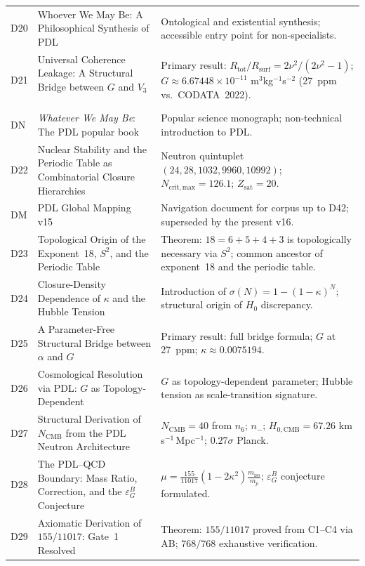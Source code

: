 \documentclass[11pt,a4paper]{article}
\theoremstyle{plain}
\theoremstyle{definition}
\theoremstyle{remark}
\newcommand{\epsGeomB}{\varepsilon_G^B}
\begin{document}
\begin{longtable}{L{1.3cm}L{3.8cm}L{8.0cm}}
D20 & Whoever We May Be: A Philosophical Synthesis of PDL~\cite{D20} & Ontological and existential synthesis; accessible entry point for non-specialists.\\[0.3em]
D21 & Universal Coherence Leakage: A Structural Bridge between $G$ and $V_3$~\cite{D21} & \textcolor{proofblue}{Primary result}: $R_{\mathrm{tot}}/R_{\mathrm{surf}} = 2\nu^2/(2\nu^2-1)$; $G \approx 6.67448\times 10^{-11}$ m$^3$kg$^{-1}$s$^{-2}$ (27~ppm vs.\ CODATA~2022).\\[0.3em]
DN & \emph{Whatever We May Be}: The PDL popular book~\cite{DN} & Popular science monograph; non-technical introduction to PDL.\\[0.3em]
D22 & Nuclear Stability and the Periodic Table as Combinatorial Closure Hierarchies~\cite{D22} & Neutron quintuplet $(24,28,1032,9960,10992)$; $N_{\mathrm{crit,max}}=126.1$; $Z_{\mathrm{sat}}=20$.\\[0.3em]
DM & PDL Global Mapping v15~\cite{DMapv10} & Navigation document for corpus up to D42; superseded by the present v16.\\[0.3em]
D23 & Topological Origin of the Exponent~18, $S^2$, and the Periodic Table~\cite{D23} & \textcolor{proofblue}{Theorem}: $18=6+5+4+3$ is topologically necessary via $S^2$; common ancestor of exponent~18 and the periodic table.\\[0.3em]
D24 & Closure-Density Dependence of $\kappa$ and the Hubble Tension~\cite{D24} & Introduction of $\sigma(N)=1-(1-\kappa)^N$; structural origin of $H_0$ discrepancy.\\[0.3em]
D25 & A Parameter-Free Structural Bridge between $\alpha$ and $G$~\cite{D25} & \textcolor{proofblue}{Primary result}: full bridge formula; $G$ at 27~ppm; $\kappa\approx 0.0075194$.\\[0.3em]
D26 & Cosmological Resolution via PDL: $G$ as Topology-Dependent~\cite{D26} & $G$ as topology-dependent parameter; Hubble tension as scale-transition signature.\\[0.3em]
D27 & Structural Derivation of $N_{\mathrm{CMB}}$ from the PDL Neutron Architecture~\cite{D27} & $N_{\mathrm{CMB}}=40$ from $n_6$; $n_{-}$; $H_{0,\mathrm{CMB}}=67.26$ km\,s$^{-1}$\,Mpc$^{-1}$; $0.27\sigma$ Planck.\\[0.3em]
D28 & The PDL--QCD Boundary: Mass Ratio, Correction, and the $\epsGeomB$ Conjecture~\cite{D28} & $\mu = \frac{155}{11017}(1-2\kappa^2)\frac{m_{\mathrm{iso}}}{m_p}$; $\epsGeomB$ conjecture formulated.\\[0.3em]
D29 & Axiomatic Derivation of $155/11017$: Gate~1 Resolved~\cite{D29} & \textcolor{proofblue}{Theorem}: $155/11017$ proved from C1--C4 via AB; $768/768$ exhaustive verification.\\[0.3em]

\end{longtable}
\end{document}
